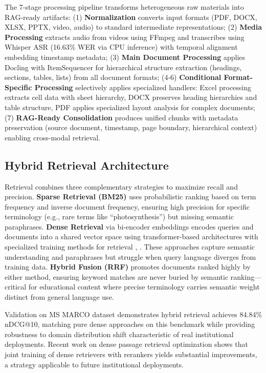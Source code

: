 \documentclass[11pt,a4paper,twocolumn]{article}
\begin{document}
The 7-stage processing pipeline transforms heterogeneous raw materials into RAG-ready artifacts: (1) \textbf{Normalization} converts input formats (PDF, DOCX, XLSX, PPTX, video, audio) to standard intermediate representations; (2) \textbf{Media Processing} extracts audio from videos using FFmpeg and transcribes using Whisper ASR (16.63\% WER via CPU inference) \cite{radford2022whisper} with temporal alignment embedding timestamp metadata; (3) \textbf{Main Document Processing} applies Docling with ItemSequencer for hierarchical structure extraction (headings, sections, tables, lists) from all document formats; (4-6) \textbf{Conditional Format-Specific Processing} selectively applies specialized handlers: Excel processing extracts cell data with sheet hierarchy, DOCX preserves heading hierarchies and table structure, PDF applies specialized layout analysis for complex documents; (7) \textbf{RAG-Ready Consolidation} produces unified chunks with metadata preservation (source document, timestamp, page boundary, hierarchical context) enabling cross-modal retrieval.

\subsection{Hybrid Retrieval Architecture}

Retrieval combines three complementary strategies to maximize recall and precision. \textbf{Sparse Retrieval (BM25)} \cite{robertson2009probabilistic} uses probabilistic ranking based on term frequency and inverse document frequency, ensuring high precision for specific terminology (e.g., rare terms like ``photosynthesis'') but missing semantic paraphrases. \textbf{Dense Retrieval} via bi-encoder embeddings encodes queries and documents into a shared vector space using transformer-based architectures \cite{vaswani2017transformer} with specialized training methods for retrieval \cite{karpukhin2020dense}, \cite{reimers2019sentencebert}. These approaches capture semantic understanding and paraphrases but struggle when query language diverges from training data. \textbf{Hybrid Fusion (RRF)} promotes documents ranked highly by either method, ensuring keyword matches are never buried by semantic ranking—critical for educational content where precise terminology carries semantic weight distinct from general language use.

Validation on MS MARCO dataset demonstrates hybrid retrieval achieves 84.84\% nDCG@10, matching pure dense approaches on this benchmark while providing robustness to domain distribution shift characteristic of real institutional deployments. Recent work on dense passage retrieval optimization \cite{rocketqa2021} shows that joint training of dense retrievers with rerankers yields substantial improvements, a strategy applicable to future institutional deployments.
\end{document}

